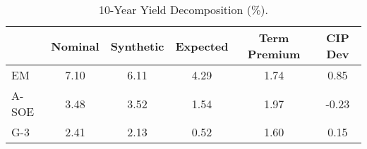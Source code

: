 \begin{tiny}\begin{table}\centering\begin{tabular}{l|ccccc}\toprule & Nominal & Synthetic & Expected & Term Premium & CIP Dev \\\midrule EM & 7.10 & 6.11 & 4.29 & 1.74 & 0.85 \\A-SOE & 3.48 & 3.52 & 1.54 & 1.97 & -0.23 \\G-3 & 2.41 & 2.13 & 0.52 & 1.60 & 0.15 \\\bottomrule\end{tabular}\caption{10-Year Yield Decomposition (\%).}\label{tab:decomp10yr}\end{table}\end{tiny}